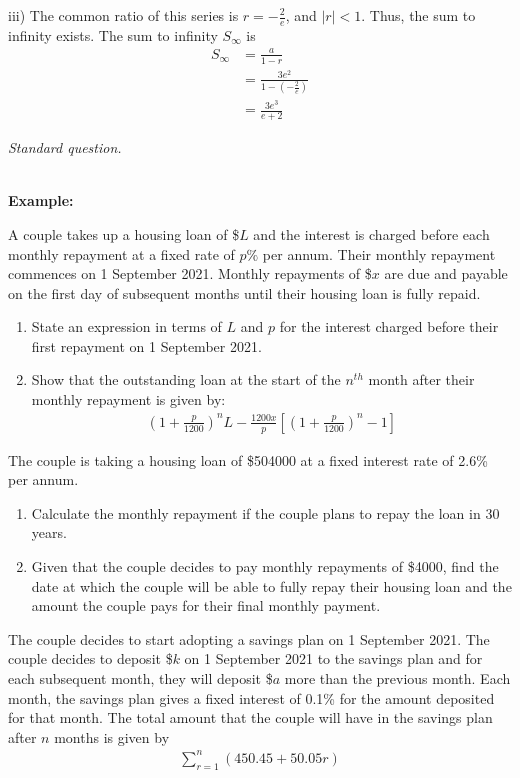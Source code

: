 \documentclass[12pt, a4paper, titlepage]{article}
\begin{document}
iii)
The common ratio of this series is $r = -\frac{2}{e}$, and $|r| < 1$. Thus, the sum to infinity exists. The sum to infinity $S_\infty$ is
\begin{align*}
    S_{\infty} &= \frac{a}{1 - r} \\
    &= \frac{3e^2}{1 - (-\frac{2}{e})} \\
    &= \frac{3e^3}{e + 2}
\end{align*}

\emph{Standard question.}

\textbf{\\ Example:}

A couple takes up a housing loan of \$$L$ and the interest is charged before each monthly repayment at a fixed rate of $p\%$ per annum. Their monthly repayment commences on 1 September 2021. Monthly repayments of \$$x$ are due and payable on the first day of subsequent months until their housing loan is fully repaid.

\begin{enumerate}[label=(\roman*)]
    \item State an expression in terms of $L$ and $p$ for the interest charged before their first repayment on 1 September 2021.
    \item Show that the outstanding loan at the start of the $n^{th}$ month after their monthly repayment is given by:
    \begin{align*}
        (1 + \frac{p}{1200})^nL - \frac{1200x}{p}[(1 + \frac{p}{1200})^n - 1]
    \end{align*}
\end{enumerate}

The couple is taking a housing loan of \$504000 at a fixed interest rate of 2.6\% per annum.

\begin{enumerate}[resume, label=(\roman*)]
    \item Calculate the monthly repayment if the couple plans to repay the loan in 30 years.
    \item Given that the couple decides to pay monthly repayments of \$4000, find the date at which the couple will be able to fully repay their housing loan and the amount the couple pays for their final monthly payment.
\end{enumerate}

The couple decides to start adopting a savings plan on 1 September 2021. The couple decides to deposit \$$k$ on 1 September 2021 to the savings plan and for each subsequent month, they will deposit \$$a$ more than the previous month. Each month, the savings plan gives a fixed interest of 0.1\% for the amount deposited for that month. The total amount that the couple will have in the savings plan after $n$ months is given by
\begin{align*}
    \sum_{r = 1}^n (450.45 + 50.05r)
\end{align*}
\end{document}
